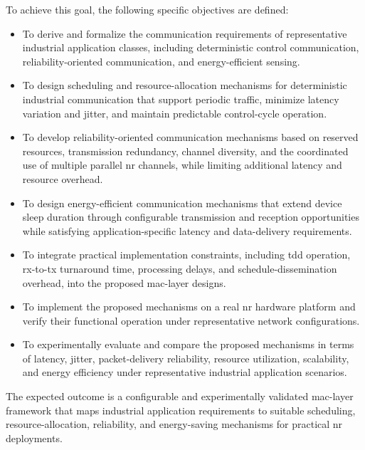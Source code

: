 \documentclass[12pt,a4paper]{article}
\begin{document}
To achieve this goal, the following specific objectives are defined:

\begin{itemize}

\item To derive and formalize the communication requirements of representative industrial application classes, including deterministic control communication, reliability-oriented communication, and energy-efficient sensing.

\item To design scheduling and resource-allocation mechanisms for deterministic industrial communication that support periodic traffic, minimize latency variation and jitter, and maintain predictable control-cycle operation.

\item To develop reliability-oriented communication mechanisms based on reserved resources, transmission redundancy, channel diversity, and the coordinated use of multiple parallel \gls{nr} channels, while limiting additional latency and resource overhead.

\item To design energy-efficient communication mechanisms that extend device sleep duration through configurable transmission and reception opportunities while satisfying application-specific latency and data-delivery requirements.

\item To integrate practical implementation constraints, including \gls{tdd} operation, \gls{rx}-to-\gls{tx} turnaround time, processing delays, and schedule-dissemination overhead, into the proposed \gls{mac}-layer designs.

\item To implement the proposed mechanisms on a real \gls{nr} hardware platform and verify their functional operation under representative network configurations.

\item To experimentally evaluate and compare the proposed mechanisms in terms of latency, jitter, packet-delivery reliability, resource utilization, scalability, and energy efficiency under representative industrial application scenarios.

\end{itemize}

The expected outcome is a configurable and experimentally validated \gls{mac}-layer framework that maps industrial application requirements to suitable scheduling, resource-allocation, reliability, and energy-saving mechanisms for practical \gls{nr} deployments.
\end{document}
